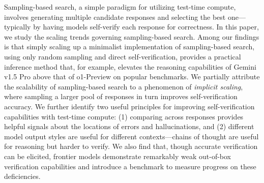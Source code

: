 \normalsize

Sampling-based search, a simple paradigm for utilizing test-time compute, involves generating multiple candidate responses and selecting the best one---typically by having models self-verify each response for correctness.
In this paper, we study the scaling trends governing sampling-based search.
Among our findings is that simply scaling up a minimalist implementation of sampling-based search, using only random sampling and direct self-verification, provides a practical inference method that, for example, elevates the reasoning capabilities of Gemini v1.5 Pro above that of o1-Preview on popular benchmarks.
We partially attribute the scalability of sampling-based search to a phenomenon of {\em implicit scaling}, where sampling a larger pool of responses in turn improves self-verification accuracy.
We further identify two useful principles for improving self-verification capabilities with test-time compute: (1) comparing across responses provides helpful signals about the locations of errors and hallucinations, and (2) different model output styles are useful for different contexts---chains of thought are useful for reasoning but harder to verify.
We also find that, though accurate verification can be elicited,  frontier models demonstrate remarkably weak out-of-box verification capabilities and introduce a benchmark to measure progress on these deficiencies.
